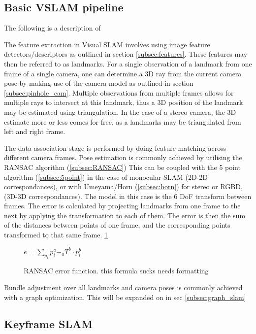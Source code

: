 \subsection{Basic VSLAM pipeline}

The following is a description of 

The feature extraction in Visual SLAM involves using image feature detectors/descriptors as
outlined in section \ref{subsec:features}.  These features may then be referred to as
landmarks. For a single observation of a landmark from one frame of a single camera, one can
determine a 3D ray from the current camera pose by making use of the camera model as outlined in
section \ref{subsec:pinhole_cam}.  Multiple observations from multiple frames allows for multiple
rays to intersect at this landmark, thus a 3D position of the landmark may be estimated using
triangulation. In the case of a stereo camera, the 3D estimate more or less comes for free, as a
landmarks may be triangulated from left and right frame.

The data association stage is performed by doing feature matching across different camera frames.
Pose estimation is commonly achieved by utilising the RANSAC algorithm (\ref{subsec:RANSAC}) 
This can be coupled with the 5 point algorithm (\ref{subsec:5point}) in the case of monocular SLAM
(2D-2D correspondances), or with Umeyama/Horn (\ref{subsec:horn}) for stereo or RGBD, (3D-3D
correspondances). The model in this case is the 6 DoF transform between frames. The error is
calculated by projecting landmarks from one frame to the next by applying the transformation to each
of them. The error is then the sum of the distances between points of one frame, and the
corresponding points transformed to that same frame. \ref{eq:ransac_error}

\begin{figure}
 \centering
 \begin{math}
  e = \sum\limits_{p_i} p^a_i - _aT^b \cdot p^b_i
 \end{math}
 \caption{RANSAC error function.  this formula sucks needs formatting}
 \label{eq:ransac_error}
\end{figure}


Bundle adjustment over all landmarks and camera poses is commonly achieved with a graph
optimization. This will be expanded on in sec \ref{subsec:graph_slam}

\subsection{Keyframe SLAM}


